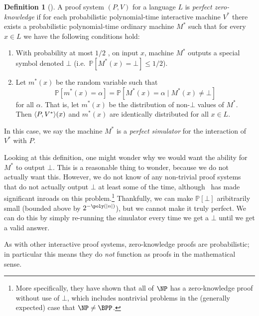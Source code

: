 \documentclass[english,12pt]{reedthesis}
\theoremstyle{plain}
\theoremstyle{definition}
\newtheorem{defn}[defn]{Definition}
\theoremstyle{remark}
\DeclarePairedDelimiter{\abs}{\lvert}{\rvert}
\DeclarePairedDelimiter{\ang}{\langle}{\rangle}
\begin{document}
\begin{defn}[{\cite[Def.\ 4.3.1]{Go01}}]\label{def:zero-knowledge}%
  A proof system $(P, V)$ for a language $L$ is \emph{perfect zero-knowledge} if
  for each probabilistic polynomial-time interactive machine $V^{*}$ there
  exists a probabilistic polynomial-time ordinary machine $M^{*}$ such that for
  every $x \in L$ we have the following conditions hold:
  \begin{enumerate}
    \item With probability at most $1/2$ , on input $x$, machine $M^{*}$ outputs
          a special symbol denoted $\bot$ (i.e.\ $\mathbb{P}[M^{*}(x) = \bot] \le 1/2$).
    \item Let $m^{*}(x)$ be the random variable such that
          \begin{equation}
            \mathbb{P}[m^{*}(x) = \alpha] = \mathbb{P}[M^{*}(x) = \alpha \mid M^{*}(x) \ne \bot]
          \end{equation}
          for all $\alpha$. That is, let $m^{*}(x)$ be the distribution of non-$\bot$
          values of $M^{*}$. Then $\ang{P, V^{*}}(x)$ and $m^{*}(x)$ are
          identically distributed for all $x \in L$.
  \end{enumerate}
  In this case, we say the machine $M^{*}$ is a \emph{perfect simulator} for the
  interaction of $V^{*}$ with $P$.
\end{defn}

Looking at this definition, one might wonder why we would want the ability for
$M^{*}$ to output $\bot$. This is a reasonable thing to wonder, because we do not
actually want this. However, we do not know of any non-trivial proof systems
that do not actually output $\bot$ at least some of the time, although~\cite{GT20}
has made significant inroads on this problem.\footnote{More specifically, they
  have shown that all of $\NP$ has a zero-knowledge proof without use of $\bot$,
  which includes nontrivial problems in the (generally expected) case that
  $\NP \ne \BPP$.} Thankfully, we can make $\mathbb{P}[\bot]$ aribitrarily small (bounded
above by $2^{-\poly(\abs{n})}$), but we cannot make it truly perfect. We can do
this by simply re-running the simulator every time we get a $\bot$ until we get a
valid answer.

As with other interactive proof systems, zero-knowledge proofs are
probabilistic; in particular this means they do \emph{not} function as proofs in
the mathematical sense.
\end{document}
